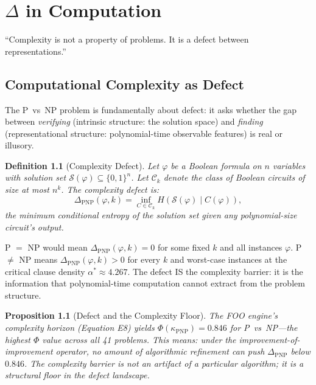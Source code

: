 \documentclass[12pt, openany]{book}
\newtheorem{proposition}[theorem]{Proposition}
\newtheorem{definition}[theorem]{Definition}
\theoremstyle{remark}
\begin{document}
\chapter{$\Delta$ in Computation}
\label{ch:computation}

\epigraph{``Complexity is not a property of problems. It is a defect between
representations.''}{}

\section{Computational Complexity as Defect}
\label{sec:complexity-defect}

The P~vs~NP problem is fundamentally about defect: it asks whether the gap
between \emph{verifying} (intrinsic structure: the solution space) and
\emph{finding} (representational structure: polynomial-time observable features)
is real or illusory.

\begin{definition}[Complexity Defect]
\label{def:complexity-defect}
Let $\varphi$ be a Boolean formula on $n$ variables with solution set
$\mathcal{S}(\varphi) \subseteq \{0,1\}^n$.  Let $\mathcal{C}_k$ denote the
class of Boolean circuits of size at most $n^k$.  The complexity defect is:
\[
  \Delta_{\mathrm{PNP}}(\varphi, k) = \inf_{C \in \mathcal{C}_k}
  H(\mathcal{S}(\varphi) \mid C(\varphi)),
\]
the minimum conditional entropy of the solution set given any polynomial-size
circuit's output.
\end{definition}

\noindent
P $=$ NP would mean $\Delta_{\mathrm{PNP}}(\varphi, k) = 0$ for some fixed $k$
and all instances $\varphi$.  P $\neq$ NP means $\Delta_{\mathrm{PNP}}(\varphi, k) > 0$
for every $k$ and worst-case instances at the critical clause density
$\alpha^* \approx 4.267$.  The defect IS the complexity barrier: it is the
information that polynomial-time computation cannot extract from the problem
structure.

\begin{proposition}[Defect and the Complexity Floor]
\label{prop:phi-pnp}
The FOO engine's complexity horizon (Equation E8) yields
$\Phi(\kappa_{\mathrm{PNP}}) = 0.846$ for P~vs~NP---the highest
$\Phi$ value across all 41 problems.  This means: under the
improvement-of-improvement operator, no amount of algorithmic
refinement can push $\Delta_{\mathrm{PNP}}$ below $0.846$.
The complexity barrier is not an artifact of a particular algorithm;
it is a \emph{structural floor} in the defect landscape.
\end{proposition}
\end{document}
